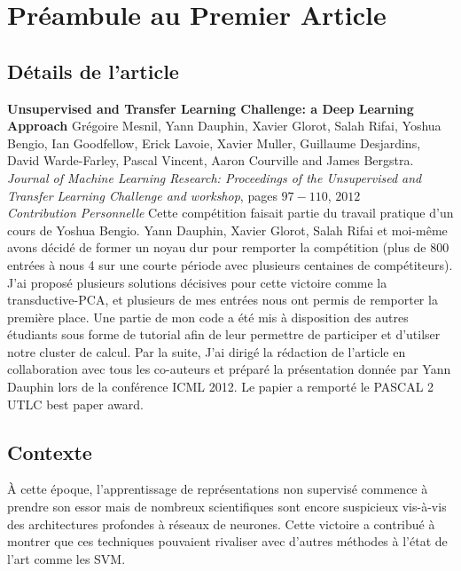 \chapter{Pr\'{e}ambule au Premier Article }

\section{D\'{e}tails de l'article}

{\bf Unsupervised and Transfer Learning Challenge: a Deep Learning Approach}
Gr\'{e}goire Mesnil, Yann Dauphin, Xavier Glorot, Salah Rifai, Yoshua Bengio,
Ian Goodfellow, Erick Lavoie, Xavier Muller, Guillaume Desjardins, David
Warde-Farley, Pascal Vincent, Aaron Courville and James Bergstra. {\it Journal
of Machine Learning Research: Proceedings of the Unsupervised and Transfer
Learning Challenge and workshop}, pages $97-110$, $2012$ \\

{\it Contribution Personnelle} Cette comp\'{e}tition faisait partie du travail
pratique d'un cours de Yoshua Bengio. Yann Dauphin, Xavier Glorot, Salah Rifai
et moi-m\^{e}me avons d\'{e}cid\'{e} de former un noyau dur pour remporter la
comp\'{e}tition (plus de 800 entr\'{e}es \`{a} nous 4 sur une courte
p\'{e}riode avec plusieurs centaines de comp\'{e}titeurs).  J'ai propos\'{e}
plusieurs solutions d\'{e}cisives pour cette victoire comme la
transductive-PCA, et plusieurs de mes entr\'{e}es nous ont permis de remporter
la premi\`{e}re place. Une partie de mon code a \'{e}t\'{e} mis \`{a}
disposition des autres \'{e}tudiants sous forme de tutorial afin de leur
permettre de participer et d'utilser notre cluster de calcul. Par la suite,
J'ai dirig\'{e} la r\'{e}daction de l'article en collaboration avec tous les
co-auteurs et pr\'{e}par\'{e} la pr\'{e}sentation donn\'{e}e par Yann Dauphin
lors de la conf\'{e}rence ICML 2012. Le papier a remport\'{e} le PASCAL 2 UTLC
best paper award. 

\section{Contexte}

\`{A} cette \'{e}poque, l'apprentissage de repr\'{e}sentations non
supervis\'{e} commence \`{a} prendre son essor mais de nombreux scientifiques
sont encore suspicieux vis-\`{a}-vis des architectures profondes à réseaux de
neurones. Cette victoire a contribu\'{e} \`{a} montrer que ces techniques
pouvaient rivaliser avec d'autres m\'{e}thodes \`{a} l'\'{e}tat de l'art comme
les SVM.

